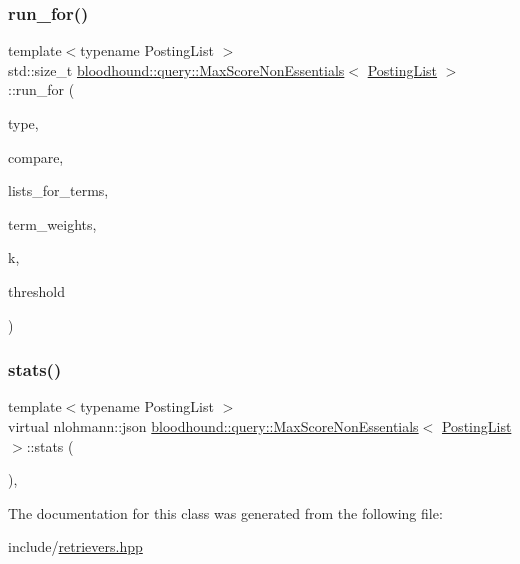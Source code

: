 \subsubsection{\texorpdfstring{run\+\_\+for()}{run\_for()}}
{\footnotesize\ttfamily template$<$typename Posting\+List $>$ \\
std\+::size\+\_\+t \mbox{\hyperlink{classbloodhound_1_1query_1_1MaxScoreNonEssentials}{bloodhound\+::query\+::\+Max\+Score\+Non\+Essentials}}$<$ \mbox{\hyperlink{classbloodhound_1_1PostingList}{Posting\+List}} $>$\+::run\+\_\+for (\begin{DoxyParamCaption}\item[{std\+::string}]{type,  }\item[{bool($\ast$)(const \mbox{\hyperlink{classbloodhound_1_1PostingList}{Posting\+List}} \&, const \mbox{\hyperlink{classbloodhound_1_1PostingList}{Posting\+List}} \&)}]{compare,  }\item[{std\+::vector$<$ \mbox{\hyperlink{classbloodhound_1_1PostingList}{Posting\+List}} $>$ \&}]{lists\+\_\+for\+\_\+terms,  }\item[{const std\+::vector$<$ \mbox{\hyperlink{structbloodhound_1_1Score}{Score}} $>$ \&}]{term\+\_\+weights,  }\item[{std\+::size\+\_\+t}]{k,  }\item[{\mbox{\hyperlink{structbloodhound_1_1Score}{Score}}}]{threshold }\end{DoxyParamCaption})\hspace{0.3cm}{\ttfamily [inline]}}

\mbox{\label{classbloodhound_1_1query_1_1MaxScoreNonEssentials_afb9b4ca76cca49d32ba584555d0b91fe}} 
\subsubsection{\texorpdfstring{stats()}{stats()}}
{\footnotesize\ttfamily template$<$typename Posting\+List $>$ \\
virtual nlohmann\+::json \mbox{\hyperlink{classbloodhound_1_1query_1_1MaxScoreNonEssentials}{bloodhound\+::query\+::\+Max\+Score\+Non\+Essentials}}$<$ \mbox{\hyperlink{classbloodhound_1_1PostingList}{Posting\+List}} $>$\+::stats (\begin{DoxyParamCaption}{ }\end{DoxyParamCaption})\hspace{0.3cm}{\ttfamily [inline]}, {\ttfamily [virtual]}}



The documentation for this class was generated from the following file\+:\begin{DoxyCompactItemize}
\item 
include/\mbox{\hyperlink{retrievers_8hpp}{retrievers.\+hpp}}\end{DoxyCompactItemize}
